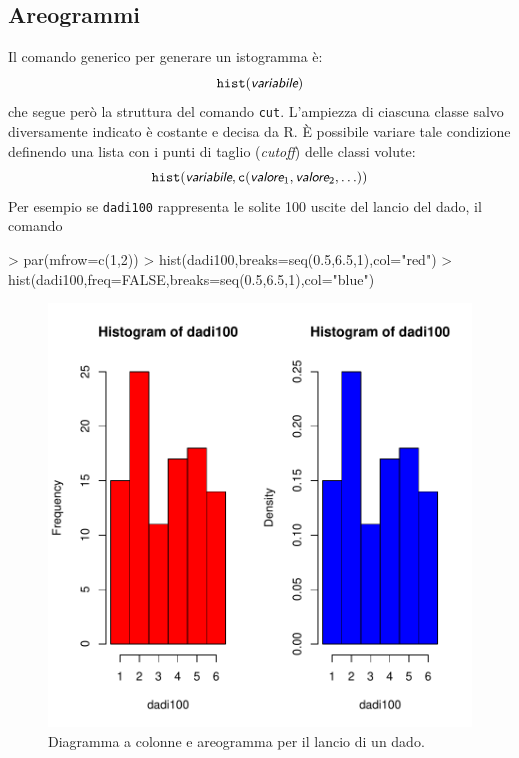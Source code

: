 \documentclass[onecolumn,12pt]{book}
\newcommand{\varia}[1]{\textsl{\textsf{#1}}}
\begin{document}
\subsection{Areogrammi}
Il comando generico per generare un istogramma \`e:
\begin{equation*}
\texttt{hist}(\varia{variabile})
\end{equation*}
che segue per\`o la struttura del comando \texttt{cut}. L'ampiezza di ciascuna classe salvo diversamente indicato \`e costante e decisa da \textsf{R}.
\`E  possibile variare tale condizione definendo una lista con i punti di taglio ({\it cutoff}) delle classi volute:
\begin{equation} \texttt{hist}(\varia{variabile},\texttt{c}(\varia{valore}_1, \varia{valore}_2, \ldots))
\end{equation}
Per esempio se \texttt{dadi100} rappresenta le solite 100 uscite del lancio del dado, il comando
\begin{Schunk}
\begin{Sinput}
> par(mfrow=c(1,2))
> hist(dadi100,breaks=seq(0.5,6.5,1),col="red")
> hist(dadi100,freq=FALSE,breaks=seq(0.5,6.5,1),col="blue")
\end{Sinput}
\end{Schunk}
\begin{figure}[htbp]
\begin{center}
\includegraphics{RbookParte2-037}
\caption{ Diagramma a colonne e areogramma per il lancio di un dado.}
\label{fig:datidado}
\end{center}
\end{figure}
\end{document}
